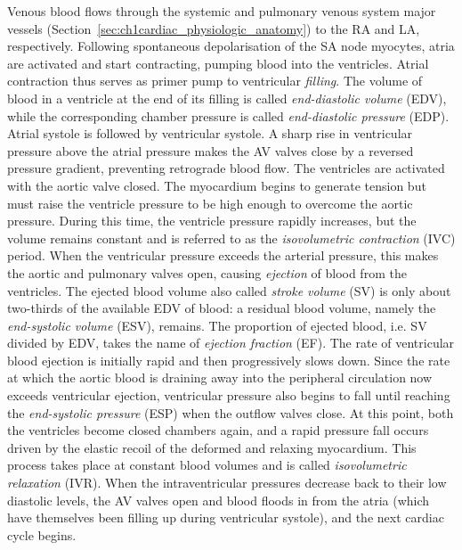 \vspace{0.2cm}
Venous blood flows through the systemic and pulmonary venous system major vessels (Section~\ref{sec:ch1cardiac_physiologic_anatomy}) to the RA and LA, respectively. Following spontaneous depolarisation of the SA node myocytes, atria are activated and start contracting, pumping blood into the ventricles. Atrial contraction thus serves as primer pump to ventricular \textit{filling}. The volume of blood in a ventricle at the end of its filling is called \textit{end-diastolic volume} (\acs{EDV}), while the corresponding chamber pressure is called \textit{end-diastolic pressure} (\acs{EDP}). Atrial systole is followed by ventricular systole. A sharp rise in ventricular pressure above the atrial pressure makes the AV valves close by a reversed pressure gradient, preventing retrograde blood flow. The ventricles are activated with the aortic valve closed. The myocardium begins to generate tension but must raise the ventricle pressure to be high enough to overcome the aortic pressure. During this time, the ventricle pressure rapidly increases, but the volume remains constant and is referred to as the \textit{isovolumetric contraction} (\acs{IVC}) period. When the ventricular pressure exceeds the arterial pressure, this makes the aortic and pulmonary valves open, causing \textit{ejection} of blood from the ventricles. The ejected blood volume also called \textit{stroke volume} (\acs{SV}) is only about two-thirds of the available EDV of blood: a residual blood volume, namely the \textit{end-systolic volume} (\acs{ESV}), remains. The proportion of ejected blood, i.e. SV divided by EDV, takes the name of \textit{ejection fraction} (\acs{EF}). The rate of ventricular blood ejection is initially rapid and then progressively slows down. Since the rate at which the aortic blood is draining away into the peripheral circulation now exceeds ventricular ejection, ventricular pressure also begins to fall until reaching the \textit{end-systolic pressure} (\acs{ESP}) when the outflow valves close. At this point, both the ventricles become closed chambers again, and a rapid pressure fall occurs driven by the elastic recoil of the deformed and relaxing myocardium. This process takes place at constant blood volumes and is called \textit{isovolumetric relaxation} (\acs{IVR}). When the intraventricular pressures decrease back to their low diastolic levels, the AV valves open and blood floods in from the atria (which have themselves been filling up during ventricular systole), and the next cardiac cycle begins.

